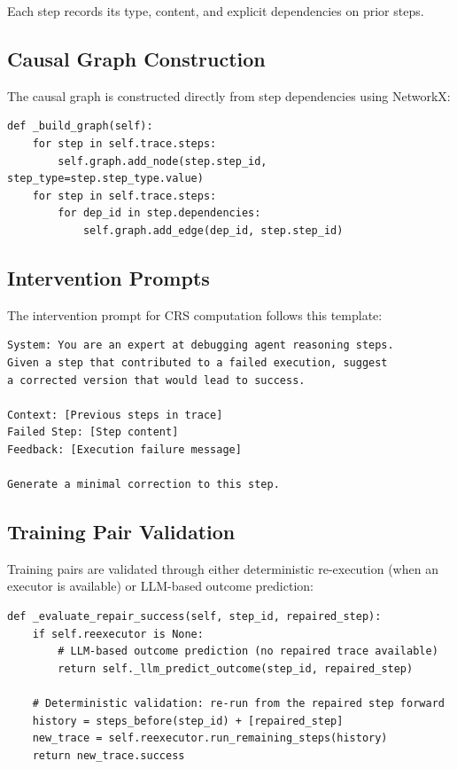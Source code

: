 \documentclass{article}
\theoremstyle{plain}
\theoremstyle{definition}
\theoremstyle{remark}
\begin{document}
Each step records its type, content, and explicit dependencies on prior steps.

\subsection{Causal Graph Construction}

The causal graph is constructed directly from step dependencies using NetworkX:

\begin{verbatim}
def _build_graph(self):
    for step in self.trace.steps:
        self.graph.add_node(step.step_id, step_type=step.step_type.value)
    for step in self.trace.steps:
        for dep_id in step.dependencies:
            self.graph.add_edge(dep_id, step.step_id)
\end{verbatim}

\subsection{Intervention Prompts}

The intervention prompt for CRS computation follows this template:

\begin{verbatim}
System: You are an expert at debugging agent reasoning steps.
Given a step that contributed to a failed execution, suggest
a corrected version that would lead to success.

Context: [Previous steps in trace]
Failed Step: [Step content]
Feedback: [Execution failure message]

Generate a minimal correction to this step.
\end{verbatim}

\subsection{Training Pair Validation}

Training pairs are validated through either deterministic re-execution (when an executor is available) or LLM-based outcome prediction:

\begin{verbatim}
def _evaluate_repair_success(self, step_id, repaired_step):
    if self.reexecutor is None:
        # LLM-based outcome prediction (no repaired trace available)
        return self._llm_predict_outcome(step_id, repaired_step)

    # Deterministic validation: re-run from the repaired step forward
    history = steps_before(step_id) + [repaired_step]
    new_trace = self.reexecutor.run_remaining_steps(history)
    return new_trace.success
\end{verbatim}
\end{document}
